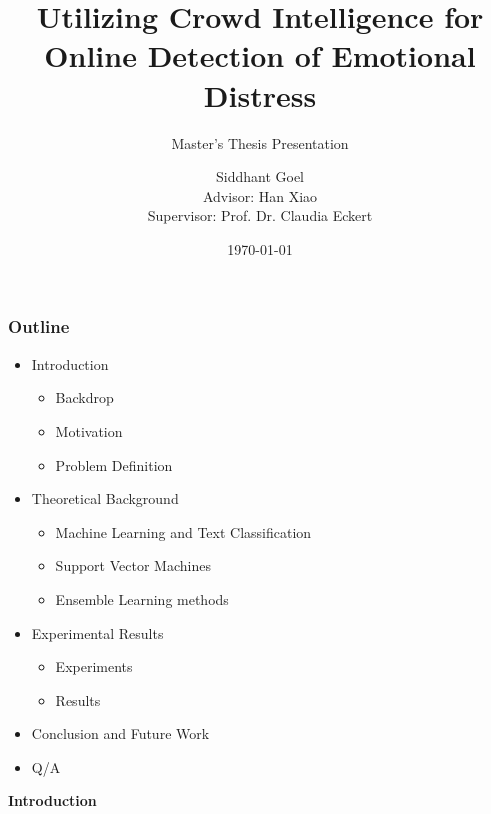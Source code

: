 \documentclass{beamer}
\title{Utilizing Crowd Intelligence for Online Detection of Emotional Distress}
\subtitle{Master's Thesis Presentation}
\author[Siddhant Goel]{Siddhant Goel\\{\small Advisor: Han Xiao\\Supervisor: Prof. Dr. Claudia Eckert}}
\institute{
Chair for IT Security\\
Technische Universit\"at M\"unchen
}
\date{\today}
\begin{document}
    \begin{frame}[plain]
        \titlepage
    \end{frame}
    
    \begin{frame}
        \frametitle{Outline}
        \begin{itemize}
            \item{
            Introduction
            \begin{itemize}
                \item{Backdrop}
                \item{Motivation}
                \item{Problem Definition}
            \end{itemize}
            }
            \item{
            Theoretical Background
            \begin{itemize}
                \item{Machine Learning and Text Classification}
                \item{Support Vector Machines}
                \item{Ensemble Learning methods}
            \end{itemize}
            }
            \item{
            Experimental Results
            \begin{itemize}
                \item{Experiments}
                \item{Results}
            \end{itemize}
            }
            \item{Conclusion and Future Work}
            \item{Q/A}
        \end{itemize}
    \end{frame}
    
    \begin{frame}
        \begin{center}
            \textbf{Introduction}
        \end{center}
    \end{frame}
    
\end{document}
